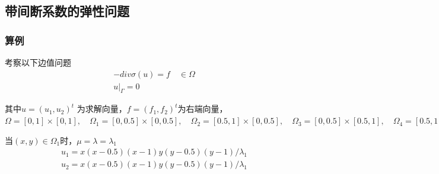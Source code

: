 \documentclass[a4paper,UTF8,titlepage]{ctexart}
\begin{document}
\begin{figure}[h]
	\centering
	\caption{}
\end{figure}

\newpage

\subsection{带间断系数的弹性问题}

\subsubsection{算例}

考察以下边值问题
$$
\begin{matrix}
	-div \sigma(u) = f \quad \in \Omega  \\
	u |_{\Gamma} = 0
\end{matrix}
$$ 
\par
其中$ u = (u_1,u_2)^t $ 为求解向量，$ f = (f_1,f_2)^t $为右端向量，
$ 
\Omega = [0,1] \times [0,1] , \quad 
\Omega_1 = [0,0.5] \times [0,0.5] , \quad
\Omega_2 = [0.5,1] \times [0,0.5], \quad
\Omega_3 = [0,0.5] \times [0.5,1], \quad
\Omega_4 = [0.5,1] \times [0.5,1]
$ 
\par
当$(x,y) \in \Omega_1$时，$\mu = \lambda = \lambda_1$
$$
\begin{matrix}
	u_1 = x (x-0.5) (x-1) y (y-0.5) (y-1) / \lambda_1
	\\
	u_2 = x (x-0.5) (x-1) y (y-0.5) (y-1) / \lambda_1
\end{matrix}
$$
\end{document}
